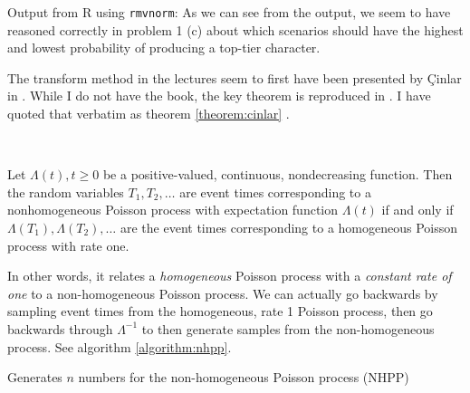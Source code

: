 \documentclass[a4paper,english,12pt]{article}
\begin{document}
Output from R using \texttt{rmvnorm}:
As we can see from the output, we seem to have reasoned correctly in problem 1
(c) about which scenarios should have the highest and lowest probability of
producing a top-tier character.

\clearpage
{}
The transform method in the lectures seem to first have been presented by
Çinlar in \cite[p.~96]{cinlar}. While I do not have the book, the key theorem 
is reproduced in \cite{generating}. I have quoted that verbatim as
theorem \ref{theorem:cinlar} .

~\begin{theorem}
  \label{theorem:cinlar}
  Let $\Lambda(t), t \geqslant 0$ be a positive-valued, continuous,
  nondecreasing function. Then the random variables $T_1, T_2, \dots$ are event
  times corresponding to a nonhomogeneous Poisson process with expectation
  function $\Lambda(t)$ if and only if $\Lambda(T_1), \Lambda(T_2), \dots$ are
  the event times corresponding to a homogeneous Poisson process with rate one.
\end{theorem}

In other words, it relates a \textit{homogeneous} Poisson process with a
\textit{constant rate of one} to a non-homogeneous Poisson process. We can
actually go backwards by sampling event times from the homogeneous, rate 1
Poisson process, then go backwards through $\Lambda^{-1}$ to then generate
samples from the non-homogeneous process. See algorithm \vref{algorithm:nhpp}.

\begin{algorithm}
  \caption{Generates $n$ numbers for the non-homogeneous Poisson process (NHPP)}
  \label{algorithm:nhpp}
  \begin{algorithmic}[1]
       
      \State {}
    \EndFunction
      \EndFor
      \State {}
    \EndFunction
  \end{algorithmic}
\end{algorithm}
\end{document}
